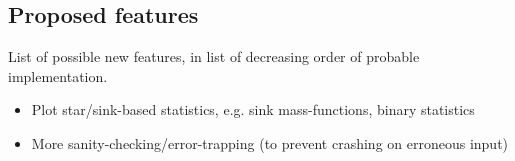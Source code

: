 \documentclass[a4paper]{article}
\begin{document}
\subsection{Proposed features}
List of possible new features, in list of decreasing order of probable implementation.
\begin{itemize}
\item Plot star/sink-based statistics, e.g. sink mass-functions, binary statistics
\item More sanity-checking/error-trapping (to prevent crashing on erroneous input)
\end{itemize}
\end{document}
